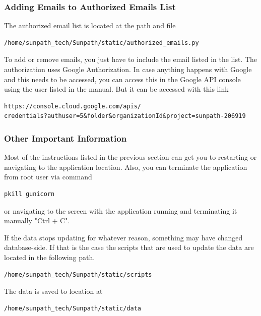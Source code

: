 \documentclass[titlepage]{article}
\begin{document}
\subsubsection{Adding Emails to Authorized Emails List}
The authorized email list is located at the path and file
\begin{verbatim}
/home/sunpath_tech/Sunpath/static/authorized_emails.py
\end{verbatim}
To add or remove emails, you just have to include the email listed in the list. The authorization uses Google Authorization. In case anything happens with Google and this needs to be accessed, you can access this in the Google API console using the user listed in the manual. But it can be accessed with this link 
\begin{verbatim}
https://console.cloud.google.com/apis/
credentials?authuser=5&folder&organizationId&project=sunpath-206919
\end{verbatim}

\subsubsection{Other Important Information}
Most of the instructions listed in the previous section can get you to restarting or navigating to the application location. Also, you can terminate the application from root user via command 
\begin{verbatim}
pkill gunicorn
\end{verbatim}
or navigating to the screen with the application running and terminating it manually "Ctrl + C". 

If the data stops updating for whatever reason, something may have changed database-side. If that is the case the scripts that are used to update the data are located in the following path.
\begin{verbatim}
/home/sunpath_tech/Sunpath/static/scripts
\end{verbatim}
The data is saved to location at 
\begin{verbatim}
/home/sunpath_tech/Sunpath/static/data
\end{verbatim}
\end{document}
